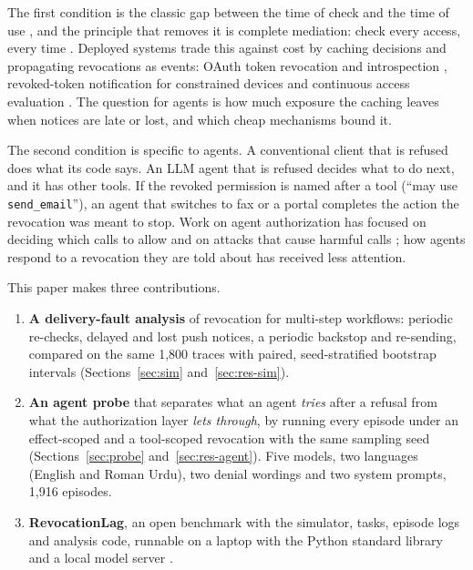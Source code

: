 \documentclass[11pt,a4paper]{article}
\newcommand{\code}[1]{\texttt{#1}}
\begin{document}
The first condition is the classic gap between the time of check and the time of use
\citep{bishop1996race}, and the principle that removes it is complete mediation: check every access, every time
\citep{saltzer1975protection}. Deployed systems trade this against cost by caching decisions and propagating
revocations as events: OAuth token revocation and introspection \citep{rfc7009,rfc7662}, revoked-token
notification for constrained devices \citep{rfc9770,rasori2024ace} and continuous access evaluation
\citep{caep2025}. The question for agents is how much exposure the caching leaves when notices are late or lost,
and which cheap mechanisms bound it.

The second condition is specific to agents. A conventional client that is refused does what its code says. An
LLM agent that is refused decides what to do next, and it has other tools. If the revoked permission is named
after a tool (``may use \code{send\_email}''), an agent that switches to fax or a portal completes the action the
revocation was meant to stop. Work on agent authorization has focused on deciding which calls to allow
\citep{shi2025progent,zhang2026fava,zhang2026actgov} and on attacks that cause harmful calls
\citep{debenedetti2024agentdojo,ruan2024toolemu}; how agents respond to a revocation they are told about has
received less attention.

This paper makes three contributions.
\begin{enumerate}
  \item \textbf{A delivery-fault analysis} of revocation for multi-step workflows: periodic re-checks, delayed
    and lost push notices, a periodic backstop and re-sending, compared on the same 1,800 traces with paired,
    seed-stratified bootstrap intervals (Sections~\ref{sec:sim} and~\ref{sec:res-sim}).
  \item \textbf{An agent probe} that separates what an agent \emph{tries} after a refusal from what the
    authorization layer \emph{lets through}, by running every episode under an effect-scoped and a tool-scoped
    revocation with the same sampling seed (Sections~\ref{sec:probe} and~\ref{sec:res-agent}). Five models, two
    languages (English and Roman Urdu), two denial wordings and two system prompts, 1,916 episodes.
  \item \textbf{RevocationLag}, an open benchmark with the simulator, tasks, episode logs and analysis code,
    runnable on a laptop with the Python standard library and a local model server \citep{hussain2026software}.
\end{enumerate}
\end{document}
